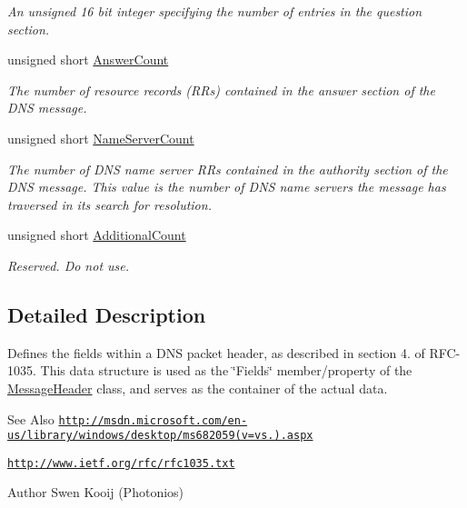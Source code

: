 \begin{DoxyCompactItemize}
\begin{DoxyCompactList}\small\item\em An unsigned 16 bit integer specifying the number of entries in the question section. \end{DoxyCompactList}\item 
unsigned short \hyperlink{struct_senergy_1_1_dns_1_1_message_header_fields_a38e5101ec862c400628d66192c5b9878}{Answer\-Count}
\begin{DoxyCompactList}\small\item\em The number of resource records (R\-Rs) contained in the answer section of the D\-N\-S message. \end{DoxyCompactList}\item 
unsigned short \hyperlink{struct_senergy_1_1_dns_1_1_message_header_fields_a963b92841b3f7fc5fc9268c963d32d8d}{Name\-Server\-Count}
\begin{DoxyCompactList}\small\item\em The number of D\-N\-S name server R\-Rs contained in the authority section of the D\-N\-S message. This value is the number of D\-N\-S name servers the message has traversed in its search for resolution. \end{DoxyCompactList}\item 
unsigned short \hyperlink{struct_senergy_1_1_dns_1_1_message_header_fields_aae6ba21a1c8baa30f0aafe90d165420f}{Additional\-Count}
\begin{DoxyCompactList}\small\item\em Reserved. Do not use. \end{DoxyCompactList}\end{DoxyCompactItemize}


\subsection{Detailed Description}
Defines the fields within a D\-N\-S packet header, as described in section 4. of R\-F\-C-\/1035. This data structure is used as the \char`\"{}\-Fields\char`\"{} member/property of the \hyperlink{class_senergy_1_1_dns_1_1_message_header}{Message\-Header} class, and serves as the container of the actual data. 

\begin{DoxySeeAlso}{See Also}
\href{http://msdn.microsoft.com/en-us/library/windows/desktop/ms682059(v=vs.85).aspx}{\tt http\-://msdn.\-microsoft.\-com/en-\/us/library/windows/desktop/ms682059(v=vs.).\-aspx} 

\href{http://www.ietf.org/rfc/rfc1035.txt}{\tt http\-://www.\-ietf.\-org/rfc/rfc1035.\-txt}
\end{DoxySeeAlso}
\begin{DoxyAuthor}{Author}
Swen Kooij (Photonios) 
\end{DoxyAuthor}


